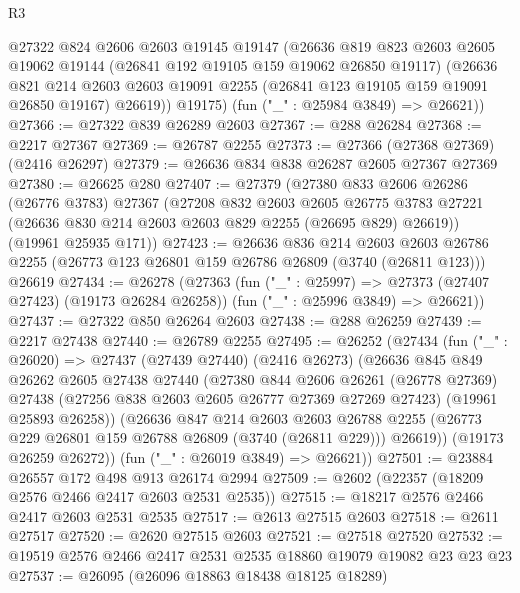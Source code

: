 \begin{lexlean}{R3}
\begin{coremodule}
      @27322
        @824
        @2606
        @2603
        @19145
        @19147
        (@26636
          @819
          @823
          @2603
          @2605
          @19062
          @19144
          (@26841 @192 @19105 @159 @19062 @26850 @19117)
          (@26636
            @821
            @214
            @2603
            @2603
            @19091
            @2255
            (@26841 @123 @19105 @159 @19091 @26850 @19167)
            @26619))
        @19175)
      (fun ("_" : @25984 @3849) => @26621))
@27366 := @27322 @839 @26289 @2603
@27367 := @288 @26284
@27368 := @2217 @27367
@27369 := @26787 @2255
@27373 := @27366 (@27368 @27369) (@2416 @26297)
@27379 := @26636 @834 @838 @26287 @2605 @27367 @27369
@27380 := @26625 @280
@27407 := @27379
    (@27380
      @833
      @2606
      @26286
      (@26776 @3783)
      @27367
      (@27208
        @832
        @2603
        @2605
        @26775
        @3783
        @27221
        (@26636 @830 @214 @2603 @2603 @829 @2255 (@26695 @829) @26619))
      (@19961 @25935 @171))
@27423 := @26636
    @836
    @214
    @2603
    @2603
    @26786
    @2255
    (@26773 @123 @26801 @159 @26786 @26809 (@3740 (@26811 @123)))
    @26619
@27434 := @26278
    (@27363
      (fun ("_" : @25997) => @27373 (@27407 @27423) (@19173 @26284 @26258))
      (fun ("_" : @25996 @3849) => @26621))
@27437 := @27322 @850 @26264 @2603
@27438 := @288 @26259
@27439 := @2217 @27438
@27440 := @26789 @2255
@27495 := @26252
    (@27434
      (fun ("_" : @26020) =>
      @27437
        (@27439 @27440)
        (@2416 @26273)
        (@26636
          @845
          @849
          @26262
          @2605
          @27438
          @27440
          (@27380
            @844
            @2606
            @26261
            (@26778 @27369)
            @27438
            (@27256 @838 @2603 @2605 @26777 @27369 @27269 @27423)
            (@19961 @25893 @26258))
          (@26636
            @847
            @214
            @2603
            @2603
            @26788
            @2255
            (@26773 @229 @26801 @159 @26788 @26809 (@3740 (@26811 @229)))
            @26619))
        (@19173 @26259 @26272))
      (fun ("_" : @26019 @3849) => @26621))
@27501 := @23884 @26557 @172 @498 @913 @26174 @2994
@27509 := @2602 (@22357 (@18209 @2576 @2466 @2417 @2603 @2531 @2535))
@27515 := @18217 @2576 @2466 @2417 @2603 @2531 @2535
@27517 := @2613 @27515 @2603
@27518 := @2611 @27517
@27520 := @2620 @27515 @2603
@27521 := @27518 @27520
@27532 := @19519 @2576 @2466 @2417 @2531 @2535 @18860 @19079 @19082 @23 @23 @23
@27537 := @26095 (@26096 @18863 @18438 @18125 @18289)

\end{coremodule}
\end{lexlean}
